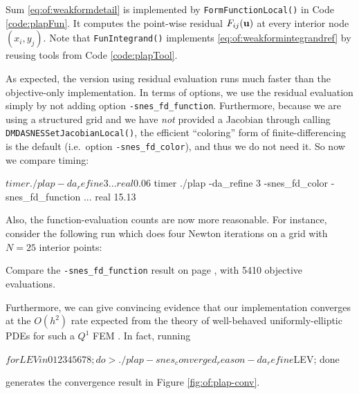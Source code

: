 Sum \eqref{eq:of:weakformdetail} is implemented by \texttt{FormFunctionLocal()} in Code \ref{code:plapFun}.  It computes the point-wise residual $F_{ij}(\mathbf{u})$ at every interior node $(x_i,y_j)$.  Note that \texttt{FunIntegrand()} implements \eqref{eq:of:weakformintegrandref} by reusing tools from Code \ref{code:plapTool}.

As expected, the version using residual evaluation runs much faster than the objective-only implementation.  In terms of \PETSc options, we use the residual evaluation simply by not adding option \texttt{-snes\_fd\_function}.  Furthermore, because we are using a \pDMDA structured grid and we have \emph{not} provided a Jacobian through calling \texttt{DMDASNESSetJacobianLocal()}, the efficient ``coloring'' form of finite-differencing is the default (i.e.~option \texttt{-snes\_fd\_color}), and thus we do not need it.  So now we compare timing:
\begin{cline}
$ timer ./plap -da_refine 3
...
real 0.06
$ timer ./plap -da_refine 3 -snes_fd_color -snes_fd_function
...
real 15.13
\end{cline}

Also, the function-evaluation counts are now more reasonable.  For instance, consider the following run which does four Newton iterations on a grid with $N=25$ interior points:
Compare the \texttt{-snes\_fd\_function} result on page \pageref{page:of:badEvalcount}, with 5410 objective evaluations.

Furthermore, we can give convincing evidence that our implementation converges at the $O(h^2)$ rate expected from the theory of well-behaved uniformly-elliptic PDEs for such a $Q^1$ FEM \citep{Elmanetal2005}.  In fact, running
\begin{cline}
$ for LEV in 0 1 2 3 4 5 6 7 8; do
> ./plap -snes_converged_reason -da_refine $LEV; done
\end{cline}
generates the convergence result in Figure \ref{fig:of:plap-conv}.

